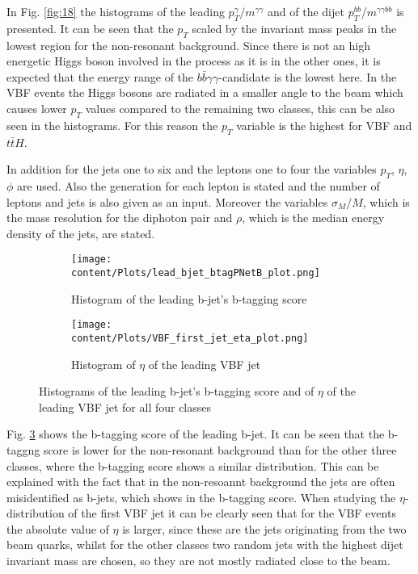 In Fig. \ref{fig:18} the histograms of the leading $p_T^{\gamma}/m^{\gamma \gamma}$ and of the dijet $p_T^{bb}$/$m^{\gamma \gamma bb}$ is presented. It can be seen that 
the $p_T$ scaled by the invariant mass peaks in the lowest region for the non-resonant background. Since there is not an high energetic Higgs boson involved in the process as it is in the other ones,
it is expected that the energy range of the $b \bar{b} \gamma \gamma$-candidate is the lowest here. In the VBF events the Higgs bosons are radiated in a smaller angle to the beam which
causes lower $p_T$ values compared to the remaining two classes, this can be also seen in the histograms. For this reason the $p_T$ variable is the highest for VBF and $t \bar{t} H$.

In addition for the jets one to six and the leptons one to four the variables $p_T$, $\eta$, $\phi$ are used. Also the generation for each lepton is stated and the number of leptons and jets is
also given as an input. Moreover the variables $\sigma_M/M$, which is the mass resolution for the diphoton pair and $\rho$, which is the median energy density of the jets, are stated. \\

\begin{figure}[H]
    \centering
    \begin{subfigure}{0.45\textwidth}
        \centering
        \texttt{[image: content/Plots/lead\_bjet\_btagPNetB\_plot.png]}
        \caption{Histogram of the leading b-jet's b-tagging score}
        \label{fig:roc1}
    \end{subfigure}
    \hfill
    \begin{subfigure}{0.45\textwidth}
        \centering
        \texttt{[image: content/Plots/VBF\_first\_jet\_eta\_plot.png]}
        \caption{Histogram of $\eta$ of the leading VBF jet}
        \label{fig:roc2}
    \end{subfigure}
    \caption{Histograms of the leading b-jet's b-tagging score and of $\eta$ of the leading VBF jet for all four classes}
    \label{fig:19}
\end{figure}

Fig. \ref{fig:19} shows the b-tagging score of the leading b-jet. It can be seen that the b-taggng score is lower for the non-resonant background than for the other three classes, where 
the b-tagging score shows a similar distribution. This can be explained with the fact that in the non-resoannt background the jets are often misidentified as b-jets, which shows in the b-tagging score.
When studying the $\eta$-distribution of the first VBF jet it can be clearly seen that for the VBF events the absolute value of $\eta$ is larger, since these are the jets originating from the two beam quarks,
whilst for the other classes two random jets with the highest dijet invariant mass are chosen, so they are not mostly radiated close to the beam. \\


